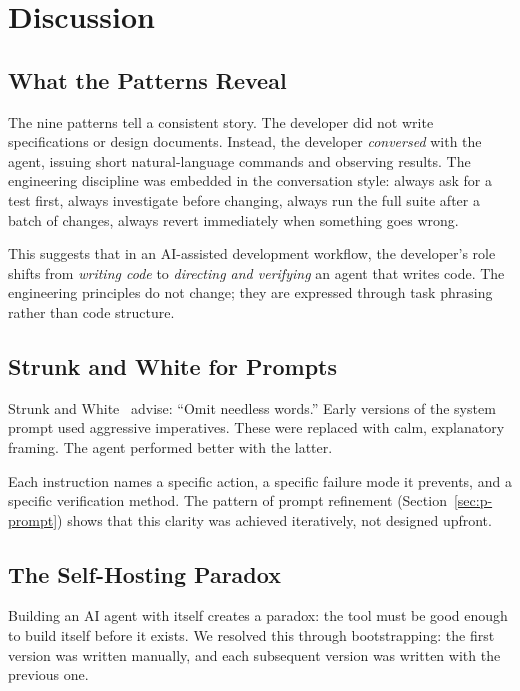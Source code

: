 \documentclass{article}
\begin{document}
\section{Discussion}
\label{sec:discussion}

\subsection{What the Patterns Reveal}

The nine patterns tell a consistent story.
The developer did not write specifications or design documents.
Instead, the developer \emph{conversed} with the agent, issuing
short natural-language commands and observing results.
The engineering discipline was embedded in the conversation style:
always ask for a test first, always investigate before changing,
always run the full suite after a batch of changes, always revert
immediately when something goes wrong.

This suggests that in an AI-assisted development workflow, the
developer's role shifts from \emph{writing code} to
\emph{directing and verifying} an agent that writes code.
The engineering principles do not change; they are expressed
through task phrasing rather than code structure.

\subsection{Strunk and White for Prompts}

Strunk and White~\cite{strunkwhite2000} advise: ``Omit needless
words.''
Early versions of the system prompt used aggressive imperatives.
These were replaced with calm, explanatory framing.
The agent performed better with the latter.

Each instruction names a specific action, a specific failure mode
it prevents, and a specific verification method.
The pattern of prompt refinement (Section~\ref{sec:p-prompt})
shows that this clarity was achieved iteratively, not designed
upfront.

\subsection{The Self-Hosting Paradox}

Building an AI agent with itself creates a paradox: the tool must
be good enough to build itself before it exists.
We resolved this through bootstrapping: the first version was
written manually, and each subsequent version was written with
the previous one.
\end{document}
